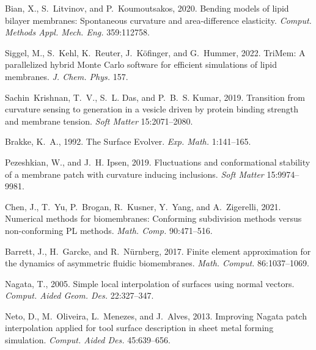 \documentclass[twocolumn]{biophys-new}
\begin{document}
\begin{thebibliography}{52}
Bian, X., S.~Litvinov, and P.~Koumoutsakos, 2020.
\newblock Bending models of lipid bilayer membranes: Spontaneous curvature and
  area-difference elasticity.
\newblock \emph{Comput. Methods Appl. Mech. Eng.} 359:112758.

Siggel, M., S.~Kehl, K.~Reuter, J.~K{\"o}finger, and G.~Hummer, 2022.
\newblock TriMem: A parallelized hybrid Monte Carlo software for efficient
  simulations of lipid membranes.
\newblock \emph{J. Chem. Phys.} 157.

Sachin~Krishnan, T.~V., S.~L. Das, and P.~B.~S. Kumar, 2019.
\newblock Transition from curvature sensing to generation in a vesicle driven
  by protein binding strength and membrane tension.
\newblock \emph{Soft Matter} 15:2071--2080.

Brakke, K.~A., 1992.
\newblock The Surface Evolver.
\newblock \emph{Exp. Math.} 1:141--165.

Pezeshkian, W., and J.~H. Ipsen, 2019.
\newblock Fluctuations and conformational stability of a membrane patch with
  curvature inducing inclusions.
\newblock \emph{Soft Matter} 15:9974--9981.

Chen, J., T.~Yu, P.~Brogan, R.~Kusner, Y.~Yang, and A.~Zigerelli, 2021.
\newblock Numerical methods for biomembranes: Conforming subdivision methods
  versus non-conforming PL methods.
\newblock \emph{Math. Comp.} 90:471--516.

Barrett, J., H.~Garcke, and R.~N{\"u}rnberg, 2017.
\newblock Finite element approximation for the dynamics of asymmetric fluidic
  biomembranes.
\newblock \emph{Math. Comput.} 86:1037--1069.

Nagata, T., 2005.
\newblock Simple local interpolation of surfaces using normal vectors.
\newblock \emph{Comput. Aided Geom. Des.} 22:327--347.

Neto, D., M.~Oliveira, L.~Menezes, and J.~Alves, 2013.
\newblock Improving Nagata patch interpolation applied for tool surface
  description in sheet metal forming simulation.
\newblock \emph{Comput. Aided Des.} 45:639--656.


\end{thebibliography}
\end{document}
